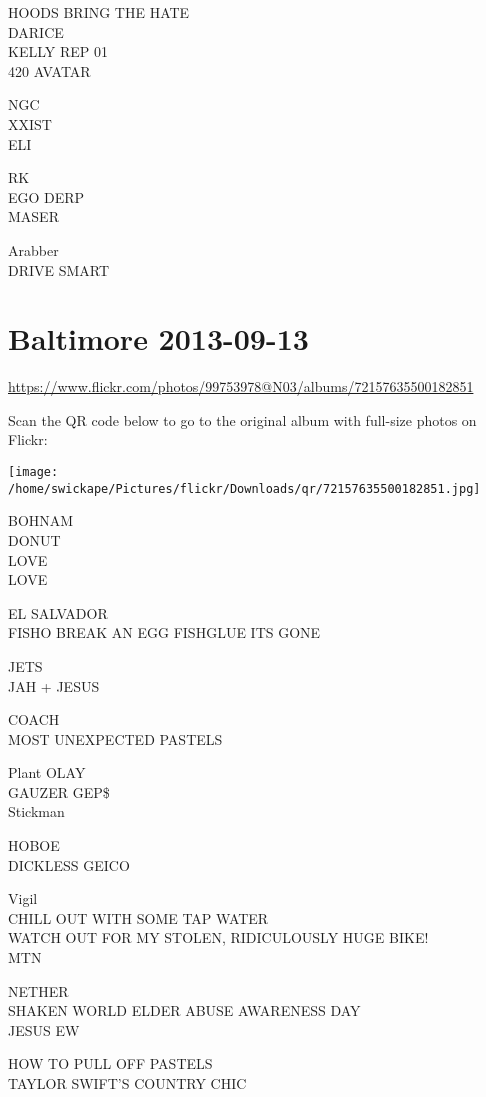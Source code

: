 \documentclass[10pt,letterpaper]{article}
\begin{document}
HOODS BRING THE HATE\\
DARICE\\
KELLY REP 01\\
420 AVATAR

NGC\\
XXIST\\
ELI

RK\\
EGO DERP\\
MASER

Arabber\\
DRIVE SMART
\pagebreak

\section*{Baltimore 2013-09-13}

\url{https://www.flickr.com/photos/99753978@N03/albums/72157635500182851}

Scan the QR code below to go to the original album with full-size photos on Flickr:

\texttt{[image: /home/swickape/Pictures/flickr/Downloads/qr/72157635500182851.jpg]}
\pagebreak

BOHNAM\\
DONUT\\
LOVE\\
LOVE

EL SALVADOR\\
FISHO BREAK AN EGG FISHGLUE ITS GONE

JETS\\
JAH + JESUS

COACH\\
MOST UNEXPECTED PASTELS

Plant OLAY\\
GAUZER GEP\$\\
Stickman

HOBOE\\
DICKLESS GEICO

Vigil\\
CHILL OUT WITH SOME TAP WATER\\
WATCH OUT FOR MY STOLEN, RIDICULOUSLY HUGE BIKE!\\
MTN

NETHER\\
SHAKEN WORLD ELDER ABUSE AWARENESS DAY\\
JESUS EW

HOW TO PULL OFF PASTELS\\
TAYLOR SWIFT'S COUNTRY CHIC
\pagebreak
\end{document}
